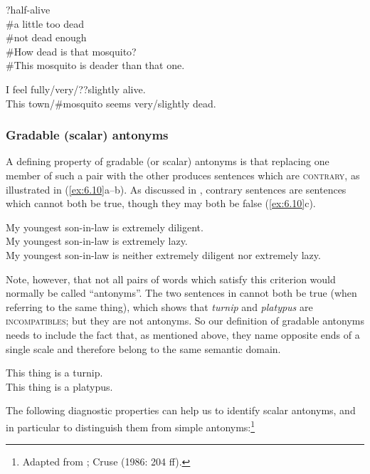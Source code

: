\ea \label{ex:6.8}
\ea ?half-alive\\
\ex \#a little too dead\\
\ex \#not dead enough\\
\ex \#How dead is that mosquito?\\
\ex \#This mosquito is deader than that one.
                       \z
\z

\ea \label{ex:6.9}
\ea I feel fully/very/??slightly alive.\\
\ex This town/\#mosquito seems very/slightly dead.
                       \z
\z

\subsubsection{Gradable (scalar) antonyms}\label{sec:6.2.2.2}

A defining property of gradable (or scalar) antonyms is that replacing one member of such a pair with the other produces sentences which are \textsc{contrary}, as illustrated in (\ref{ex:6.10}a--b). As discussed in , contrary sentences are sentences which cannot both be true, though they may both be false (\ref{ex:6.10}c).


\ea \label{ex:6.10}
\ea My youngest son-in-law is extremely diligent.\\
\ex My youngest son-in-law is extremely lazy.\\
\ex My youngest son-in-law is neither extremely diligent nor extremely lazy.
                       \z
\z


Note, however, that not all pairs of words which satisfy this criterion would normally be called “antonyms”. The two sentences in  cannot both be true (when referring to the same thing), which shows that \textit{turnip} and \textit{platypus} are \textsc{incompatibles}; but they are not antonyms. So our definition of gradable antonyms needs to include the fact that, as mentioned above, they name opposite ends of a single scale and therefore belong to the same semantic domain.


\ea \label{ex:6.11}
\ea This thing is a turnip.\\
\ex This thing is a platypus.
                       \z
\z


The following diagnostic properties can help us to identify scalar antonyms, and in particular to distinguish them from simple antonyms:\footnote{Adapted from \citet[67]{Saeed2009}; Cruse (1986: 204 ff).}


